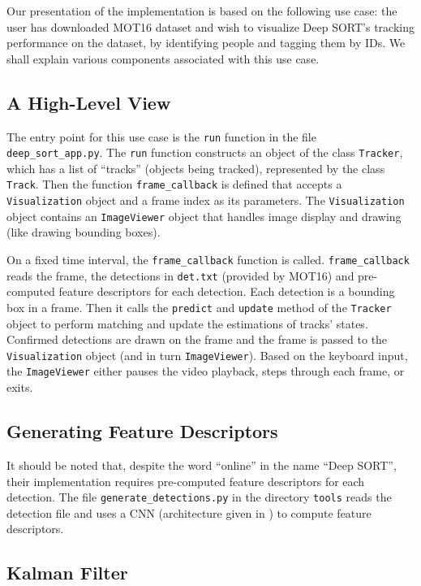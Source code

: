 \documentclass[conference]{IEEEtran}
\begin{document}
Our presentation of the implementation is based on the following use case: the user has downloaded MOT16 \cite{milan2016mot16} dataset and wish to visualize Deep SORT's tracking performance on the dataset, by identifying people and tagging them by IDs. We shall explain various components associated with this use case.

\subsection{A High-Level View}

The entry point for this use case is the \texttt{run} function in the file \texttt{deep\_sort\_app.py}. The \texttt{run} function constructs an object of the class \texttt{Tracker}, which has a list of ``tracks'' (objects being tracked), represented by the class \texttt{Track}. Then the function \texttt{frame\_callback} is defined that accepts a \texttt{Visualization} object and a frame index as its parameters. The \texttt{Visualization} object contains an \texttt{ImageViewer} object that handles image display and drawing (like drawing bounding boxes).

On a fixed time interval, the \texttt{frame\_callback} function is called. \texttt{frame\_callback} reads the frame, the detections in \texttt{det.txt} (provided by MOT16) and pre-computed feature descriptors for each detection. Each detection is a bounding box in a frame. Then it calls the \texttt{predict} and \texttt{update} method of the \texttt{Tracker} object to perform matching and update the estimations of tracks' states. Confirmed detections are drawn on the frame and the frame is passed to the \texttt{Visualization} object (and in turn \texttt{ImageViewer}). Based on the keyboard input, the \texttt{ImageViewer} either pauses the video playback, steps through each frame, or exits.

\subsection{Generating Feature Descriptors}

It should be noted that, despite the word ``online'' in the name ``Deep SORT'', their implementation requires pre-computed feature descriptors for each detection. The file \texttt{generate\_detections.py} in the directory \texttt{tools} reads the detection file and uses a CNN (architecture given in \cite{Wojke2018deep}) to compute feature descriptors.

\subsection{Kalman Filter}
\end{document}
